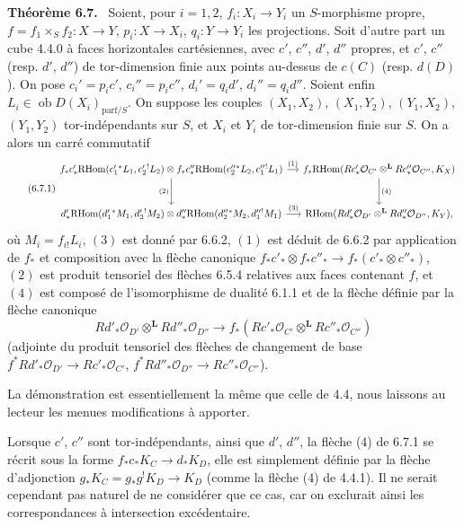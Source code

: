 \documentclass[11pt]{article}
\providecommand{\cO}{\mathcal{O}}
\newenvironment{statement}[1]{\par\medskip\noindent\textbf{#1.}\ }{\par\medskip}
\providecommand{\RHom}{\mathrm{RHom}}
\providecommand{\RHom}{\mathrm{RHom}}
\begin{document}
\begin{statement}{Théorème 6.7}
Soient, pour $i=1,2$, $f_i:X_i\to Y_i$ un $S$-morphisme propre, $f=f_1\times_Sf_2:X\to Y$, $p_i:X\to X_i$, $q_i:Y\to Y_i$ les projections. Soit d'autre part un cube 4.4.0 à faces horizontales cartésiennes, avec $c'$, $c''$, $d'$, $d''$ propres, et $c'$, $c''$ (resp. $d'$, $d''$) de tor-dimension finie aux points au-dessus de $c(C)$ (resp. $d(D)$). On pose $c_i'=p_ic'$, $c_i''=p_ic''$, $d_i'=q_id'$, $d_i''=q_id''$. Soient enfin $L_i\in\operatorname{ob}D(X_i)_{\mathrm{parf}/S}$. On suppose les couples $(X_1,X_2)$, $(X_1,Y_2)$, $(Y_1,X_2)$, $(Y_1,Y_2)$ tor-indépendants sur $S$, et $X_i$ et $Y_i$ de tor-dimension finie sur $S$. On a alors un carré commutatif
\begin{equation}
\tag{6.7.1}
\begin{tikzcd}[column sep=small,row sep=large]
f_*c'_*\RHom(c_1'{}^*L_1,c_2'{}^!L_2)\otimes f_*c''_*\RHom(c_2''{}^*L_2,c_1''{}^!L_1) \arrow[r,"(1)"] \arrow[d,"(2)"']
& f_*\RHom(Rc'_*\cO_{C'}\otimes^{\mathbf L}Rc''_*\cO_{C''},K_X) \arrow[d,"(4)"] \\
d'_*\RHom(d_1'{}^*M_1,d_2'{}^!M_2)\otimes d''_*\RHom(d_2''{}^*M_2,d_1''{}^!M_1) \arrow[r,"(3)"]
& \RHom(Rd'_*\cO_{D'}\otimes^{\mathbf L}Rd''_*\cO_{D''},K_Y),
\end{tikzcd}
\end{equation}
où $M_i=f_{i!}L_i$, $(3)$ est donné par 6.6.2, $(1)$ est déduit de 6.6.2 par application de $f_*$ et composition avec la flèche canonique $f_*c'_*\otimes f_*c''_*\to f_*(c'_*\otimes c''_*)$, $(2)$ est produit tensoriel des flèches 6.5.4 relatives aux faces contenant $f$, et $(4)$ est composé de l'isomorphisme de dualité 6.1.1 et de la flèche définie par la flèche canonique
\[
Rd'_*\cO_{D'}\otimes^{\mathbf L}Rd''_*\cO_{D''}\longrightarrow f_*(Rc'_*\cO_{C'}\otimes^{\mathbf L}Rc''_*\cO_{C''})
\]
(adjointe du produit tensoriel des flèches de changement de base $f^*Rd'_*\cO_{D'}\to Rc'_*\cO_{C'}$, $f^*Rd''_*\cO_{D''}\to Rc''_*\cO_{C''}$).
\end{statement}

La démonstration est essentiellement la même que celle de 4.4, nous laissons au lecteur les menues modifications à apporter.

Lorsque $c'$, $c''$ sont tor-indépendants, ainsi que $d'$, $d''$, la flèche (4) de 6.7.1 se récrit sous la forme $f_*c_*K_C\to d_*K_D$, elle est simplement définie par la flèche d'adjonction $g_*K_C=g_*g^!K_D\to K_D$ (comme la flèche (4) de 4.4.1). Il ne serait cependant pas naturel de ne considérer que ce cas, car on exclurait ainsi les correspondances à intersection excédentaire.
\end{document}
